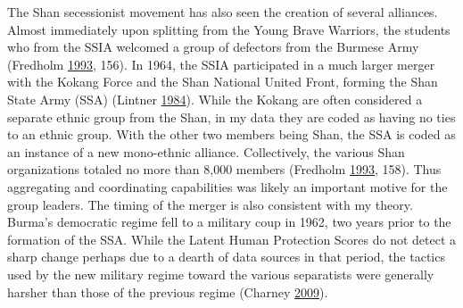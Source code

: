 \documentclass[12pt,]{book}
\theoremstyle{definition}
\theoremstyle{definition}
\theoremstyle{definition}
\theoremstyle{remark}
\begin{document}
The Shan secessionist movement has also seen the creation of several
alliances. Almost immediately upon splitting from the Young Brave
Warriors, the students who from the SSIA welcomed a group of defectors
from the Burmese Army (Fredholm
\protect\hyperlink{ref-Fredholm1993}{1993}, 156). In 1964, the SSIA
participated in a much larger merger with the Kokang Force and the Shan
National United Front, forming the Shan State Army (SSA) (Lintner
\protect\hyperlink{ref-Lintner1984}{1984}). While the Kokang are often
considered a separate ethnic group from the Shan, in my data they are
coded as having no ties to an ethnic group. With the other two members
being Shan, the SSA is coded as an instance of a new mono-ethnic
alliance. Collectively, the various Shan organizations totaled no more
than 8,000 members (Fredholm \protect\hyperlink{ref-Fredholm1993}{1993},
158). Thus aggregating and coordinating capabilities was likely an
important motive for the group leaders. The timing of the merger is also
consistent with my theory. Burma's democratic regime fell to a military
coup in 1962, two years prior to the formation of the SSA. While the
Latent Human Protection Scores do not detect a sharp change perhaps due
to a dearth of data sources in that period, the tactics used by the new
military regime toward the various separatists were generally harsher
than those of the previous regime (Charney
\protect\hyperlink{ref-Charney2009}{2009}).
\end{document}
